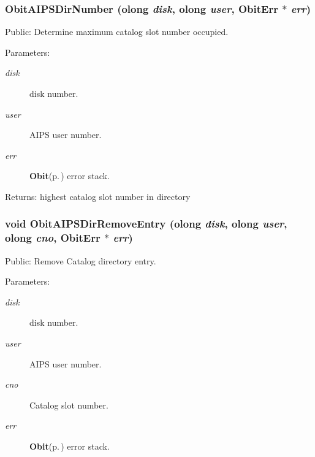 \subsubsection{ Obit\-AIPSDir\-Number ({\bf olong} {\em disk}, {\bf olong} {\em user}, {\bf Obit\-Err} $\ast$ {\em err})}\label{ObitAIPSDir_8h_a13}


Public: Determine maximum catalog slot number occupied. 

\begin{Desc}
\item[Parameters:]
\begin{description}
\item[{\em disk}]disk number. \item[{\em user}]AIPS user number. \item[{\em err}]{\bf Obit}{\rm (p.\,\pageref{structObit})} error stack. \end{description}
\end{Desc}
\begin{Desc}
\item[Returns:]highest catalog slot number in directory \end{Desc}
\subsubsection{\setlength{\rightskip}{0pt plus 5cm}void Obit\-AIPSDir\-Remove\-Entry ({\bf olong} {\em disk}, {\bf olong} {\em user}, {\bf olong} {\em cno}, {\bf Obit\-Err} $\ast$ {\em err})}\label{ObitAIPSDir_8h_a12}


Public: Remove Catalog directory entry. 

\begin{Desc}
\item[Parameters:]
\begin{description}
\item[{\em disk}]disk number. \item[{\em user}]AIPS user number. \item[{\em cno}]Catalog slot number. \item[{\em err}]{\bf Obit}{\rm (p.\,\pageref{structObit})} error stack. \end{description}
\end{Desc}
